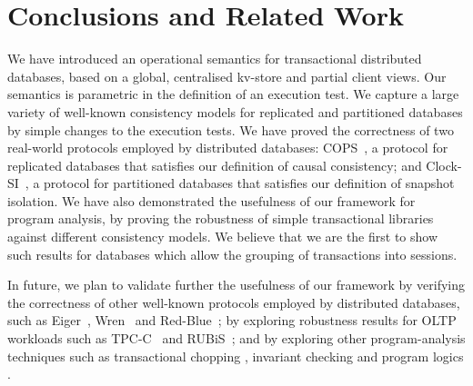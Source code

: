 \section{Conclusions and Related Work}
\label{sec:conclusions}
We have introduced  an  operational semantics for 
transactional distributed databases, based on a global, centralised 
kv-store and partial client views. 
Our semantics is parametric in the definition of an execution test.
We capture a large variety of well-known consistency models 
for replicated and partitioned databases by simple changes to  the execution tests. 
We have proved the correctness of two real-world protocols employed by distributed 
databases: COPS~\cite{cops}, a 
protocol for replicated databases that satisfies our definition of causal consistency;
and Clock-SI~\cite{clocksi}, a protocol for partitioned databases that satisfies our
definition of 
snapshot isolation. We have also demonstrated the usefulness of our framework
for program analysis, by proving the robustness of simple transactional 
libraries against different consistency models. We believe that we are
the first to show such  results for  databases which  allow
the grouping of  transactions into sessions. 

In future, we plan to validate further the usefulness of our framework
by verifying the correctness of other well-known protocols employed by
distributed databases, such as Eiger~\cite{eiger}, Wren~\cite{wren} and
Red-Blue~\cite{redblue}; by exploring robustness results for OLTP
workloads  such as TPC-C~\cite{tpcc} and RUBiS~\cite{rubis};
and by exploring other program-analysis techniques such as
transactional chopping \cite{chopping,psi-chopping}, invariant checking 
\cite{cise,repliss} and program logics \cite{alonetogether}. 


